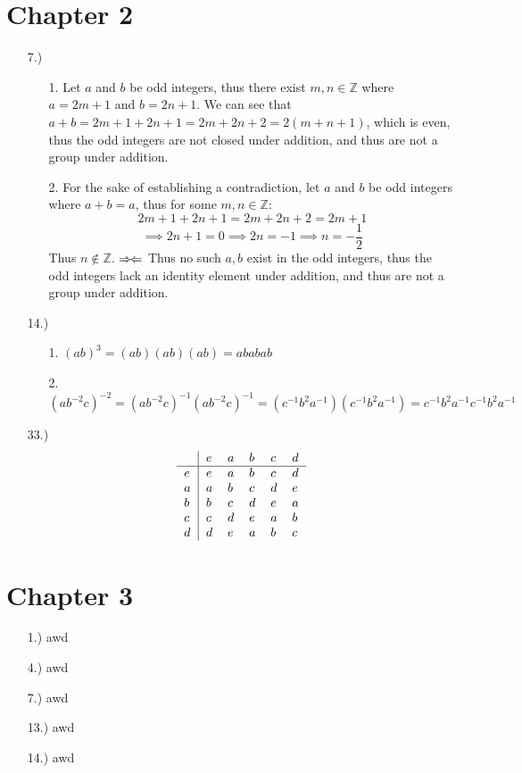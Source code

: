 \documentclass[12pt]{article}
\newcommand{\contradiction}{
    \ensuremath{{\Rightarrow\mspace{-2mu}\Leftarrow}}
}
\newcommand{\Z}{\mathbb{Z}}
\begin{document}
\section*{Chapter 2}
\begin{itemize}
    \item [7.)] \begin{itemize}
        \item [1.] Let $a$ and $b$ be odd integers, thus there exist $m,n\in\Z$ where $a=2m+1$ and $b=2n+1$. We can see that $a+b=2m+1+2n+1=2m+2n+2=2(m+n+1)$, which is even, thus the odd integers are not closed under addition, and thus are not a group under addition.

        \item [2.] For the sake of establishing a contradiction, let $a$ and $b$ be odd integers where $a+b=a$, thus for some $m,n\in\Z$:
        \[2m+1+2n+1=2m+2n+2=2m+1\]
        \[\implies2n+1=0\implies2n=-1\implies n=-\frac{1}{2}\]
        Thus $n\notin\Z$.\contradiction Thus no such $a,b$ exist in the odd integers, thus the odd integers lack an identity element under addition, and thus are not a group under addition.
    \end{itemize}

    \item [14.)] \begin{itemize}
        \item [1.] $(ab)^3=(ab)(ab)(ab)=ababab$

        \item [2.] $(ab^{-2}c)^{-2}=(ab^{-2}c)^{-1}(ab^{-2}c)^{-1}=(c^{-1}b^2a^{-1})(c^{-1}b^2a^{-1})=c^{-1}b^2a^{-1}c^{-1}b^2a^{-1}$
    \end{itemize}

    \item [33.)] \[
        \begin{tabular}{l|lllll}
            & $e$ & $a$ & $b$ & $c$ & $d$ \\
            \hline
            $e$ & $e$ & $a$ & $b$ & $c$ & $d$ \\
            $a$ & $a$ & $b$ & $c$ & $d$ & $e$ \\
            $b$ & $b$ & $c$ & $d$ & $e$ & $a$ \\
            $c$ & $c$ & $d$ & $e$ & $a$ & $b$ \\
            $d$ & $d$ & $e$ & $a$ & $b$ & $c$
        \end{tabular}
        \]

\end{itemize}

\section*{Chapter 3}
\begin{itemize}
    \item [1.)] awd

    \item [4.)] awd
    
    \item [7.)] awd

    \item [13.)] awd

    \item [14.)] awd
\end{itemize}
\end{document}
